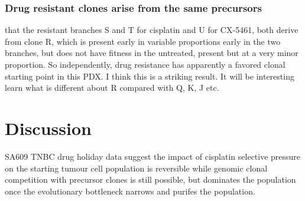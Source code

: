 
\subsubsection{Drug resistant clones arise from the same precursors}
that the resistant branches S and T for cisplatin and U for CX-5461, both derive from clone R, which is present early in variable proportions early in the two branches, but does not have fitness in the untreated, present but at a very minor proportion. So independently, drug resistance has apparently a favored clonal starting point in this PDX. I think this is a striking result. It will be interesting learn what is different about R compared with Q, K, J etc. 








\section{Discussion}
SA609 TNBC drug holiday data suggest the impact of cisplatin selective pressure on the starting tumour cell population is reversible while genomic clonal competition with precursor clones is still possible, but dominates the population once the evolutionary bottleneck narrows and purifes the population.

